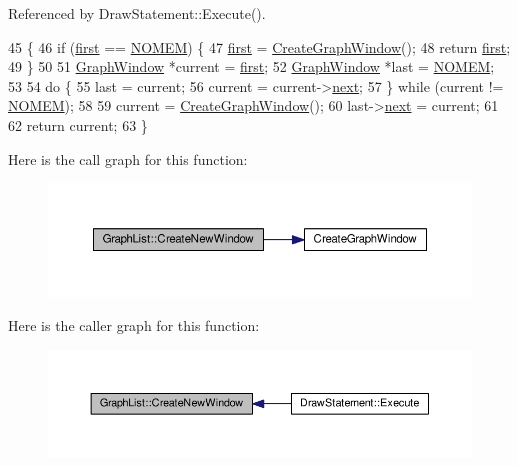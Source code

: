 Referenced by Draw\+Statement\+::\+Execute().


\begin{DoxyCode}
45 \{
46     \textcolor{keywordflow}{if} (\hyperlink{classGraphList_ad4646aa3e159fc56cd56ff82ebb9b48b}{first} == \hyperlink{platform_8h_a46ff2bfbf0d44b8466a2251d5bd5e6f8}{NOMEM}) \{
47         \hyperlink{classGraphList_ad4646aa3e159fc56cd56ff82ebb9b48b}{first} = \hyperlink{io_8h_a99482ffbe19cd5e821359f26620cd89f}{CreateGraphWindow}();
48         \textcolor{keywordflow}{return} \hyperlink{classGraphList_ad4646aa3e159fc56cd56ff82ebb9b48b}{first};
49     \}
50 
51     \hyperlink{classGraphWindow}{GraphWindow} *current = \hyperlink{classGraphList_ad4646aa3e159fc56cd56ff82ebb9b48b}{first};
52     \hyperlink{classGraphWindow}{GraphWindow} *last = \hyperlink{platform_8h_a46ff2bfbf0d44b8466a2251d5bd5e6f8}{NOMEM};
53 
54     \textcolor{keywordflow}{do} \{
55         last = current;
56         current = current->\hyperlink{classGraphWindow_af84f61254f44fd2ef6b45ab703e45feb}{next};
57     \} \textcolor{keywordflow}{while} (current != \hyperlink{platform_8h_a46ff2bfbf0d44b8466a2251d5bd5e6f8}{NOMEM});
58 
59     current = \hyperlink{io_8h_a99482ffbe19cd5e821359f26620cd89f}{CreateGraphWindow}();
60     last->\hyperlink{classGraphWindow_af84f61254f44fd2ef6b45ab703e45feb}{next} = current;
61 
62     \textcolor{keywordflow}{return} current;
63 \}
\end{DoxyCode}


Here is the call graph for this function\+:
\nopagebreak
\begin{figure}[H]
\begin{center}
\leavevmode
\includegraphics[width=350pt]{d1/d57/classGraphList_a184e5ad986cd07281a96dc107ebfcd5d_cgraph}
\end{center}
\end{figure}




Here is the caller graph for this function\+:
\nopagebreak
\begin{figure}[H]
\begin{center}
\leavevmode
\includegraphics[width=350pt]{d1/d57/classGraphList_a184e5ad986cd07281a96dc107ebfcd5d_icgraph}
\end{center}
\end{figure}




